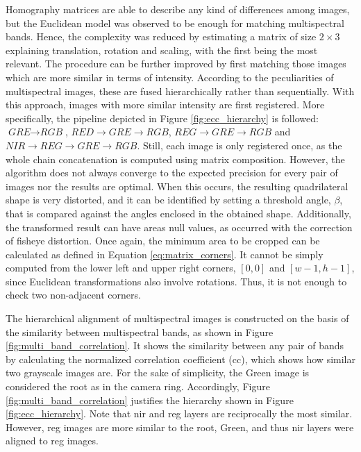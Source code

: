 Homography matrices are able to describe any kind of differences among images, but the Euclidean model was observed to be enough for matching multispectral bands. Hence, the complexity was reduced by estimating a matrix of size $2 \times 3$ explaining translation, rotation and scaling, with the first being the most relevant. The procedure can be further improved by first matching those images which are more similar in terms of intensity. According to the peculiarities of multispectral images, these are fused hierarchically rather than sequentially. With this approach, images with more similar intensity are first registered. More specifically, the pipeline depicted in Figure \ref{fig:ecc_hierarchy} is followed: $\textit{GRE} \rightarrow \textit{RGB}$, $\textit{RED} \rightarrow \textit{GRE} \rightarrow \textit{RGB}$, $\textit{REG} \rightarrow \textit{GRE} \rightarrow \textit{RGB}$ and $\textit{NIR} \rightarrow \textit{REG} \rightarrow \textit{GRE} \rightarrow \textit{RGB}$. Still, each image is only registered once, as the whole chain concatenation is computed using matrix composition. However, the algorithm does not always converge to the expected precision for every pair of images nor the results are optimal. When this occurs, the resulting quadrilateral shape is very distorted, and it can be identified by setting a threshold angle, $\beta$, that is compared against the angles enclosed in the obtained shape. Additionally, the transformed result can have areas null values, as occurred with the correction of fisheye distortion. Once again, the minimum area to be cropped can be calculated as defined in Equation \ref{eq:matrix_corners}. It cannot be simply computed from the lower left and upper right corners, $[0, 0]$ and $[w - 1, h - 1]$, since Euclidean transformations also involve rotations. Thus, it is not enough to check two non-adjacent corners.

The hierarchical alignment of multispectral images is constructed on the basis of the similarity between multispectral bands, as shown in Figure \ref{fig:multi_band_correlation}. It shows the similarity between any pair of bands by calculating the normalized correlation coefficient (\acrshort{cc}), which shows how similar two grayscale images are. For the sake of simplicity, the Green image is considered the root as in the camera ring. Accordingly, Figure \ref{fig:multi_band_correlation} justifies the hierarchy shown in Figure \ref{fig:ecc_hierarchy}. Note that \acrshort{nir} and \acrshort{reg} layers are reciprocally the most similar. However, \acrshort{reg} images are more similar to the root, Green, and thus \acrshort{nir} layers were aligned to \acrfull{reg} images.

